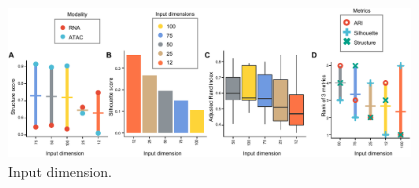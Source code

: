 \begin{figure}[!ht]
	\centering
	\includegraphics[width=0.95\textwidth]{Input_Dimensions/fig}
	\vspace{0.1cm}
	\caption[Input dimensions affection]{Input dimension.}
	\label{fig:Input_Dimensions}
\end{figure}







